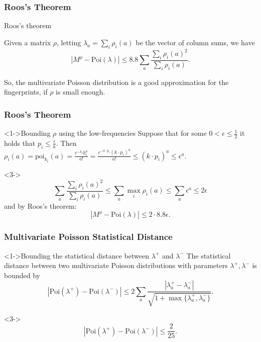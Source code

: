 \documentclass{beamer}
\newcommand{\eps}{\epsilon} \newcommand{\lam}{\lambda}
\begin{document}
\begin{frame}
  \frametitle{Roos's Theorem}
  \begin{block}{Roos's theorem}
    
    Given a matrix $\rho$, letting $\lambda_a=\sum_i\rho_i(a)$ be the
    vector of column sums, we have
    \begin{equation*}
      |M^\rho-\mbox{Poi}(\lambda)|\le
      8.8\sum_a\frac{\sum_i\rho_i(a)^2}{\sum_i \rho_i(a)}.
    \end{equation*}
  \end{block}
  So, the multivariate Poisson distribution is a good approximation
  for the fingerprints, if $\rho$ is small enough.
\end{frame}
\begin{frame}
  \frametitle{Roos's Theorem}

  \begin{block}<1->{Bounding $\rho$ using the low-frequencies}
    Suppose that for some $0<\eps\le\frac{1}{2}$ it holds that $p_i\le
    \frac{\eps}{k}$. Then
    $\rho_i(a)=\mbox{poi}_{k_i}(a)=\frac{e^{-k_i}k_i^a}{a!}=\frac{e^{-k\cdot
        p_i}(k\cdot p_i)^a}{a!}\le (k\cdot p_i) ^a\le \eps^a$.
  \end{block}

  \begin{block}<3->{}
    \begin{equation*}
      \sum_a\frac{\sum_i\rho_i(a)^2}{\sum_i \rho_i(a)}\le \sum_a\max_i \rho_i(a)\le \sum_a \eps^a\le 2\eps
    \end{equation*}
    and by Roos's theorem:
    \begin{equation*}
      |M^\rho-\mbox{Poi}(\lambda)|\le 2\cdot 8.8\eps.       
    \end{equation*}
  \end{block}
\end{frame}


\begin{frame}
  \frametitle{Multivariate Poisson Statistical Distance}
    \begin{block}<1->{Bounding the statistical distance between $\lambda^+$ and $\lambda^-$}
      The statistical distance between two multivariate Poisson
      distributions with parameters $\lambda^+, \lambda^-$ is bounded
      by
      \begin{equation*}
        |\mbox{Poi}(\lambda^+)-\mbox{Poi}(\lambda^-)|\le 2\sum_a\frac{|\lambda^+_a-\lambda^-_a|}{\sqrt{1+\max\{\lambda^+_a,\lambda_a^-\}}}.
      \end{equation*}
    \end{block}
    \begin{block}<3->{}
      \begin{equation*}
        |\mbox{Poi}(\lambda^+)-\mbox{Poi}(\lambda^-)|\le \frac{2}{25}.
      \end{equation*}
    \end{block}
\end{frame}
\end{document}
